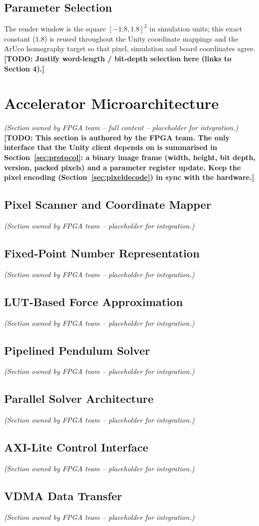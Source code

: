 \documentclass[11pt,a4paper]{article}
\newcommand{\todo}[1]{\textcolor{red!75!black}{\textbf{[TODO: #1]}}}
\newcommand{\owned}[1]{\textit{\small(Section owned by #1 -- placeholder for integration.)}}
\begin{document}
\subsection{Parameter Selection}
The render window is the square $[-1.8,1.8]^2$ in simulation units; this exact
constant ($1.8$) is reused throughout the Unity coordinate mappings and the
ArUco homography target so that pixel, simulation and board coordinates agree.
\todo{Justify word-length / bit-depth selection here (links to Section 4).}

\section{Accelerator Microarchitecture}
\owned{FPGA team -- full content}
\todo{This section is authored by the FPGA team. The only interface that the
Unity client depends on is summarised in Section~\ref{sec:protocol}: a binary
image frame (width, height, bit depth, version, packed pixels) and a parameter
register update. Keep the pixel encoding (Section~\ref{sec:pixeldecode}) in sync
with the hardware.}

\subsection{Pixel Scanner and Coordinate Mapper}\owned{FPGA team}
\subsection{Fixed-Point Number Representation}\owned{FPGA team}
\subsection{LUT-Based Force Approximation}\owned{FPGA team}
\subsection{Pipelined Pendulum Solver}\owned{FPGA team}
\subsection{Parallel Solver Architecture}\owned{FPGA team}
\subsection{AXI-Lite Control Interface}\owned{FPGA team}
\subsection{VDMA Data Transfer}\owned{FPGA team}
\end{document}
